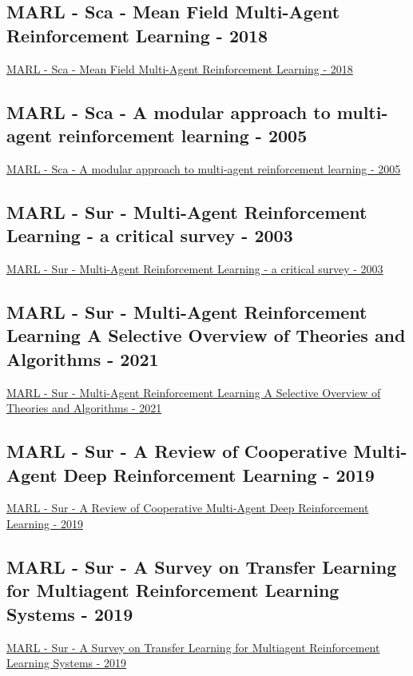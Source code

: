 \subsection{MARL - Sca - Mean Field Multi-Agent Reinforcement Learning - 2018}
\href{http://proceedings.mlr.press/v80/yang18d.html}{MARL - Sca - Mean Field Multi-Agent Reinforcement Learning - 2018}

\subsection{MARL - Sca - A modular approach to multi-agent reinforcement learning - 2005}
\href{https://link.springer.com/chapter/10.1007/3-540-62934-3_39}{MARL - Sca - A modular approach to multi-agent reinforcement learning - 2005}

\subsection{MARL - Sur - Multi-Agent Reinforcement Learning - a critical survey - 2003}
\href{http://ai.stanford.edu/people/shoham/www%20papers/MALearning_ACriticalSurvey_2003_0516.pdf}{MARL - Sur - Multi-Agent Reinforcement Learning - a critical survey - 2003}

\subsection{MARL - Sur - Multi-Agent Reinforcement Learning A Selective Overview of Theories and Algorithms - 2021}
\href{https://arxiv.org/abs/1911.10635}{MARL - Sur - Multi-Agent Reinforcement Learning A Selective Overview of Theories and Algorithms - 2021}


\subsection{MARL - Sur - A Review of Cooperative Multi-Agent Deep Reinforcement Learning - 2019}
\href{https://arxiv.org/abs/1908.03963}{MARL - Sur - A Review of Cooperative Multi-Agent Deep Reinforcement Learning - 2019}

\subsection{MARL - Sur - A Survey on Transfer Learning for Multiagent Reinforcement Learning Systems  - 2019}
\href{https://www.jair.org/index.php/jair/article/view/11396}{MARL - Sur - A Survey on Transfer Learning for Multiagent Reinforcement Learning Systems  - 2019}

